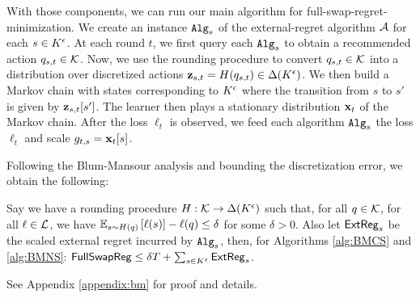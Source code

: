 \documentclass[final,12pt]{alt2025}
\begin{document}
With those components, we can run our main algorithm for full-swap-regret-minimization.  We create an instance $\mathtt{Alg}_s$ of the external-regret algorithm $\mathcal{A}$ for each $s \in K^{\epsilon}$. At each round $t$, we first query each $\mathtt{Alg}_s$ to obtain a recommended action $q_{s,t} \in \mathcal{K}$. Now, we use the rounding procedure to convert $q_{s,t} \in \mathcal{K}$ into a distribution over discretized actions $\mathbf{z}_{s,t} = H(q_{s,t}) \in \Delta(K^{\epsilon})$.  We then build a Markov chain with states corresponding to $K^{\epsilon}$ where the transition from $s$ to $s'$ is given by $\mathbf{z}_{s,t}[s']$. The learner then plays a stationary distribution $\mathbf{x}_t$ of the Markov chain. After the loss $\ell_t$ is observed, we feed each algorithm $\mathtt{Alg}_s$ the loss $\ell_t$ and scale $g_{t,s} = \mathbf{x}_t[s]$.

Following the Blum-Mansour analysis and bounding the discretization error, we obtain the following:

\begin{theorem}\label{thm:BMCS}
    Say we have a rounding procedure $H: \mathcal{K} \to \Delta(K^{\epsilon})$ such that, for all $q \in \mathcal{K}$, for all $\ell \in \mathcal{L}$, we have
    $\mathbb{E}_{s \sim H(q)}\left[\ell(s)\right] - \ell(q) \leq \delta$
    for some $\delta>0$.  Also let $\operatorname{\mathsf{ExtReg}}_s$ be the scaled external regret incurred by $\mathtt{Alg}_s$, then, for Algorithms \ref{alg:BMCS} and \ref{alg:BMNS}: $\mathsf{FullSwapReg} \leq \delta T + \sum_{s \in K^{\epsilon}} \operatorname{\mathsf{ExtReg}}_s$.
\end{theorem}

See Appendix \ref{appendix:bm} for proof and details.
\end{document}
